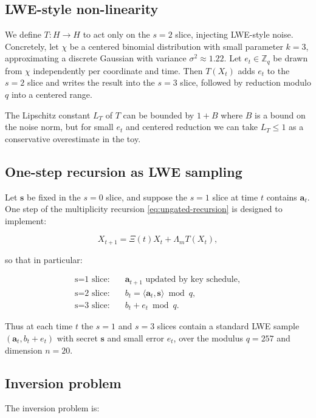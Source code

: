 \documentclass[11pt]{article}
\begin{document}
\subsection{LWE-style non-linearity}

We define $T: H \to H$ to act only on the $s=2$ slice, injecting LWE-style noise.
Concretely, let $\chi$ be a centered binomial distribution with small parameter
$k=3$, approximating a discrete Gaussian with variance $\sigma^2 \approx 1.22$.
Let $e_t \in \mathbb{Z}_q$ be drawn from $\chi$ independently per coordinate
and time. Then $T(X_t)$ adds $e_t$ to the $s=2$ slice and writes the result
into the $s=3$ slice, followed by reduction modulo $q$ into a centered range.

The Lipschitz constant $L_T$ of $T$ can be bounded by $1 + B$ where $B$ is
a bound on the noise norm, but for small $e_t$ and centered reduction we can
take $L_T \le 1$ as a conservative overestimate in the toy.\cite{pqc-lwe}

\subsection{One-step recursion as LWE sampling}

Let $\mathbf{s}$ be fixed in the $s=0$ slice, and suppose the $s=1$ slice at
time $t$ contains $\mathbf{a}_t$. One step of the multiplicity recursion
\eqref{eq:ungated-recursion} is designed to implement:

\[
X_{t+1} = \Xi(t) X_t + \Lambda_m T(X_t),
\]

so that in particular:

\begin{align*}
\text{s=1 slice:} &\quad \mathbf{a}_{t+1} \text{ updated by key schedule},\\
\text{s=2 slice:} &\quad b_t = \langle \mathbf{a}_t, \mathbf{s} \rangle \bmod q,\\
\text{s=3 slice:} &\quad b_t + e_t \bmod q.
\end{align*}

Thus at each time $t$ the $s=1$ and $s=3$ slices contain a standard LWE sample
$(\mathbf{a}_t, b_t + e_t)$ with secret $\mathbf{s}$ and small error $e_t$,
over the modulus $q=257$ and dimension $n=20$.\cite{pqc-lwe}

\subsection{Inversion problem}

The inversion problem is:
\end{document}

